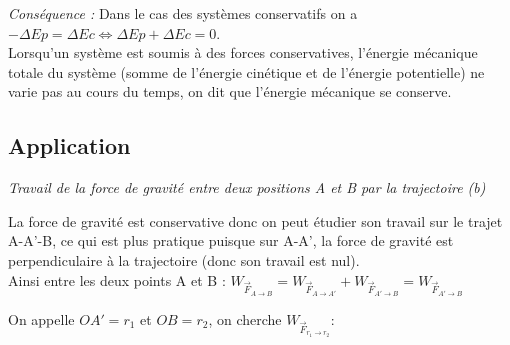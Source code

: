 \documentclass[a4paper,10pt]{book}
\begin{document}
\emph{Conséquence :} Dans le cas des systèmes conservatifs on a $-\Delta Ep=\Delta Ec \Leftrightarrow \Delta Ep+\Delta Ec=0$.\\

Lorsqu'un système est soumis à des forces conservatives, l'énergie mécanique totale du système (somme de l'énergie cinétique et de l'énergie potentielle) ne varie pas au cours du temps, on dit que l'énergie mécanique se conserve.

\subsection{Application}
\textit{Travail de la force de gravité entre deux positions A et B par la trajectoire (b)}

\begin{center}  \end{center}

La force de gravité est conservative donc on peut étudier son travail sur le trajet A-A'-B, ce qui est plus pratique puisque sur A-A', la force de gravité est perpendiculaire à la trajectoire (donc son travail est nul).\\

Ainsi entre les deux points A et B : $W_{\vec{F}_{A\rightarrow B}}=W_{\vec{F}_{A\rightarrow A'}}+W_{\vec{F}_{A'\rightarrow B}}=W_{\vec{F}_{A'\rightarrow B}}$

On appelle $OA'=r_{1}$ et $OB=r_{2}$, on cherche $W_{\vec{F}_{r_{1}\rightarrow r_{2}}}$:\\
\end{document}
